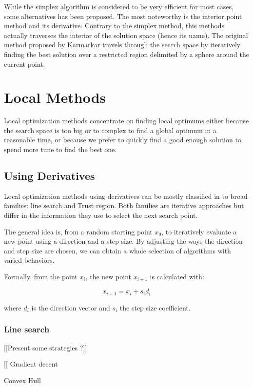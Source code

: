 While the simplex algorithm is considered to be very efficient for most cases, some alternatives has been proposed. The most noteworthy is the interior point method and its derivative. Contrary to the simplex method, this methods actually traverses the interior of the solution space (hence its name). The original method proposed by Karmarkar\cite{Karmarkar:1984:NPA:800057.808695} travels through the search space by iteratively finding the best solution over a restricted region delimited by a sphere around the current point.

\section{Local Methods}

Local optimization methods concentrate on finding local optimums either because the search space is too big or to complex to find a global optimum in a reasonable time, or because we prefer to quickly find a good enough solution to spend more time to find the best one.

\subsection{Using Derivatives}

Local optimization methods using derivatives can be mostly classified in to broad families: line search and Trust region.
Both families are iterative approaches but differ in the information they use to select the next search point.

The general idea is, from a random starting point $x_0$, to iteratively evaluate a new point using a direction and a step size.
By adjusting the ways the direction and step size are chosen, we can obtain a whole selection of algorithms with varied behaviors.

Formally, from the point $x_i$, the new point $x_{i+1}$ is calculated with:

\[ x_{i+1} = x_i +s_id_i \]

where $d_i$ is the direction vector and $s_i$ the step size coefficient.

\subsubsection{Line search}


[[Present some strategies ?]]


[[
Gradient decent

Convex Hull

